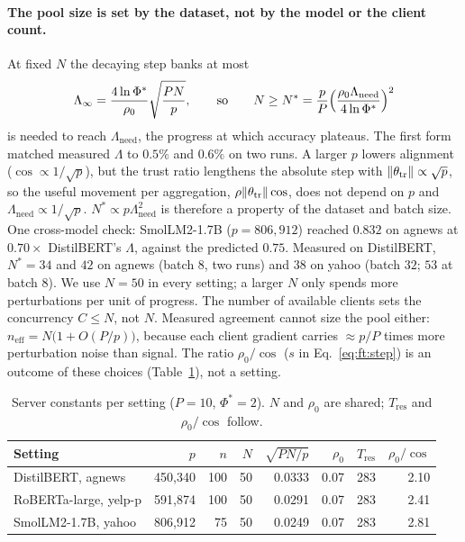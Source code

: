 \paragraph{The pool size is set by the dataset, not by the model or the client count.}
At fixed $N$ the decaying step banks at most
\begin{equation}
\Lambda_\infty=\frac{4\ln\Phi^*}{\rho_0}\sqrt{\frac{PN}{p}},\qquad\text{so}\qquad
N\ge N^*=\frac pP\Bigl(\frac{\rho_0\Lambda_{\mathrm{need}}}{4\ln\Phi^*}\Bigr)^2
\label{eq:ft:nstar}
\end{equation}
is needed to reach $\Lambda_{\mathrm{need}}$, the progress at which accuracy plateaus. The first form matched measured $\Lambda$ to $0.5\%$ and $0.6\%$ on two runs.
A larger $p$ lowers alignment ($\cos\propto1/\sqrt p$), but the trust ratio lengthens the absolute step with $\lVert \theta_{\mathrm{tr}}\rVert\propto\sqrt p$, so the useful movement per aggregation, $\rho\lVert \theta_{\mathrm{tr}}\rVert\cos$, does not depend on $p$ and $\Lambda_{\mathrm{need}}\propto1/\sqrt p$.
$N^*\propto p\Lambda_{\mathrm{need}}^2$ is therefore a property of the dataset and batch size. One cross-model check: SmolLM2-1.7B ($p=806{,}912$) reached $0.832$ on agnews at $0.70\times$ DistilBERT's $\Lambda$, against the predicted $0.75$.
Measured on DistilBERT, $N^*=34$ and $42$ on agnews (batch $8$, two runs) and $38$ on yahoo (batch $32$; $53$ at batch $8$). We use $N=50$ in every setting; a larger $N$ only spends more perturbations per unit of progress.
The number of available clients sets the concurrency $C\le N$, not $N$. Measured agreement cannot size the pool either: $n_{\mathrm{eff}}=N\bigl(1+O(P/p)\bigr)$, because each client gradient carries $\approx p/P$ times more perturbation noise than signal.
The ratio $\rho_0/\cos$ ($s$ in Eq.~\eqref{eq:ft:step}) is an outcome of these choices (Table~\ref{tab:ft:settings}), not a setting.

\begin{table}[t]
\centering
\caption{Server constants per setting ($P=10$, $\Phi^*=2$). $N$ and $\rho_0$ are shared; $T_{\mathrm{res}}$ and $\rho_0/\cos$ follow.}
\label{tab:ft:settings}
\small
\begin{tabular}{@{}lrrrrrrr@{}}
\toprule
Setting & $p$ & $n$ & $N$ & $\sqrt{PN/p}$ & $\rho_0$ & $T_{\mathrm{res}}$ & $\rho_0/\cos$ \\
\midrule
DistilBERT, agnews & 450{,}340 & 100 & 50 & 0.0333 & 0.07 & 283 & 2.10 \\
RoBERTa-large, yelp-p & 591{,}874 & 100 & 50 & 0.0291 & 0.07 & 283 & 2.41 \\
SmolLM2-1.7B, yahoo & 806{,}912 & 75 & 50 & 0.0249 & 0.07 & 283 & 2.81 \\
\bottomrule
\end{tabular}
\end{table}

